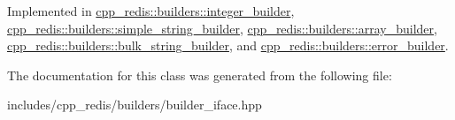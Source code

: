 Implemented in \hyperlink{classcpp__redis_1_1builders_1_1integer__builder_a4893dc36d06d75094bb4fe3fbc826966}{cpp\+\_\+redis\+::builders\+::integer\+\_\+builder}, \hyperlink{classcpp__redis_1_1builders_1_1simple__string__builder_ad586164caf02b3022b91789cac23a72d}{cpp\+\_\+redis\+::builders\+::simple\+\_\+string\+\_\+builder}, \hyperlink{classcpp__redis_1_1builders_1_1array__builder_a524f2cb943dde1246dea1b7057e6351e}{cpp\+\_\+redis\+::builders\+::array\+\_\+builder}, \hyperlink{classcpp__redis_1_1builders_1_1bulk__string__builder_a4d80d8dfe305e35aca8b4ec84c56fbea}{cpp\+\_\+redis\+::builders\+::bulk\+\_\+string\+\_\+builder}, and \hyperlink{classcpp__redis_1_1builders_1_1error__builder_af3d67647f012d0a7378684e2f8258a6d}{cpp\+\_\+redis\+::builders\+::error\+\_\+builder}.



The documentation for this class was generated from the following file\+:\begin{DoxyCompactItemize}
\item 
includes/cpp\+\_\+redis/builders/builder\+\_\+iface.\+hpp\end{DoxyCompactItemize}
